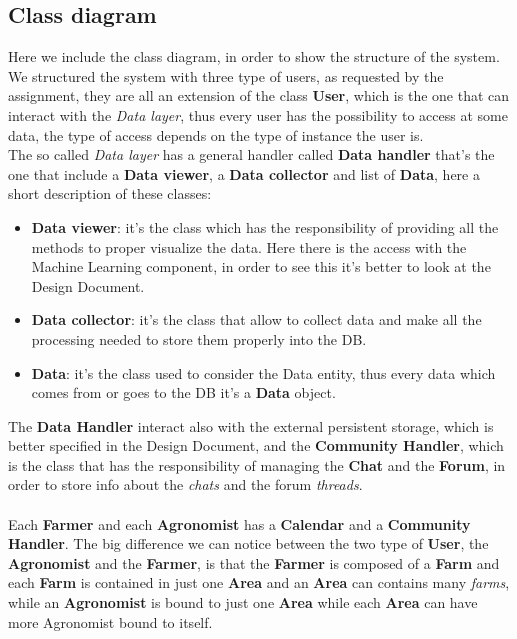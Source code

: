 \documentclass[10pt]{report}
\begin{document}
\subsection{Class diagram}
Here we include the class diagram, in order to show the structure of the system. \\
We structured the system with three type of users, as requested by the assignment, they are all an extension of the class \textbf{User}, which is the one that can interact with the \textit{Data layer}, thus every user has the possibility to access at some data, the type of access depends on the type of instance the user is. \\
The so called \textit{Data layer} has a general handler called \textbf{Data handler} that's the one that include a \textbf{Data viewer}, a \textbf{Data collector} and list of \textbf{Data}, here a short description of these classes:
\begin{itemize}
    \item \textbf{Data viewer}: it's the class which has the responsibility of providing all the methods to proper visualize the data. Here there is the access with the Machine Learning component, in order to see this it's better to look at the Design Document.
    \item \textbf{Data collector}: it's the class that allow to collect data and make all the processing needed to store them properly into the DB.
    \item \textbf{Data}: it's the class used to consider the Data entity, thus every data which comes from or goes to the DB it's a \textbf{Data} object.
\end{itemize}
The \textbf{Data Handler} interact also with the external persistent storage, which is better specified in the Design Document, and the \textbf{Community Handler}, which is the class that has the responsibility of managing the \textbf{Chat} and the \textbf{Forum}, in order to store info about the \textit{chats} and the forum \textit{threads}.\\ \\
Each \textbf{Farmer} and each \textbf{Agronomist} has a \textbf{Calendar} and a \textbf{Community Handler}. The big difference we can notice between the two type of \textbf{User}, the \textbf{Agronomist} and the \textbf{Farmer}, is that the \textbf{Farmer} is composed of a \textbf{Farm} and each \textbf{Farm} is contained in just one \textbf{Area} and an \textbf{Area} can contains many \textit{farms}, while an \textbf{Agronomist} is bound to just one \textbf{Area} while each \textbf{Area} can have more Agronomist bound to itself. \\
\end{document}
